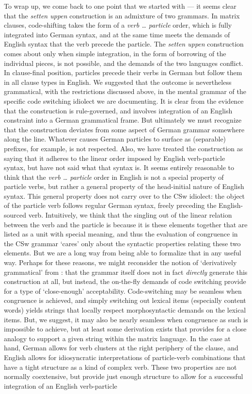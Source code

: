 \documentclass[output=paper]{langscibook}
\begin{document}
To wrap up, we come back to one point that we started with --- it seems clear that the \textit{setten uppen} construction is an admixture of two grammars. In matrix clauses, code-shifting takes the form of a \textit{verb {\ldots} particle} order, which is fully integrated into German syntax, and at the same time meets the demands of English syntax that the verb precede the particle. The \textit{setten uppen} construction comes about only when simple integration, in the form of borrowing of the individual pieces, is not possible, and the demands of the two languages conflict. In clause-final position, particles precede their verbs in German but follow them in all clause types in English. We suggested that the outcome is nevertheless grammatical, with the restrictions discussed above, in the mental grammar of the specific code switching idiolect we are documenting. It is clear from the evidence that the construction is rule-governed, and involves integration of an English constraint into a German grammatical frame. But ultimately we must recognize that the construction deviates from some aspect of German grammar somewhere along the line. Whatever causes German particles to surface as (separable) prefixes, for example, is not respected. Also, we have treated the construction as saying that it adheres to the linear order imposed by English verb-particle syntax, but have not said what that syntax is. It seems entirely reasonable to think that the \textit{verb {\ldots} particle} order in English is not a special property of particle verbs, but rather a general property of the head-initial nature of English syntax. This general property does not carry over to the CSw idiolect: the object of the particle verb follows regular German syntax, freely preceding the English-sourced verb. Intuitively, we think that the singling out of the linear relation between the verb and the particle is because it is these elements together that are listed as a unit with special meaning, and thus the evaluation of congruence in the CSw grammar `cares' only about the syntactic properties relating these two elements. But we are a long way from being able to formalize that in any useful way. Perhaps for these reasons, we might reconsider the notion of `derivatively grammatical' from \cite[242]{chomsky65}: that the grammar itself does not in fact \textit{directly} generate this construction at all, but instead, the on-the-fly demands of code switching provide for a type of `close-enough' acceptability. Code-switching may be seamless when congruence is achieved, and simply switching out lexical items (especially content words) yields strings that locally respect morphosyntactic demands on the lexical items. But, we suggest, it may also be nearly seamless when congruence as such is impossible to achieve, but at least some derivation exists that provides for a close analogy to support a given string within the matrix language. In the case at hand, German allows for verb clusters at the right periphery of the clause, and English allows for idiosyncratic interpretations of particle-verb combinations that have a tight structure as a kind of complex verb. These two properties are not normally coextensive, but provide just enough structure to allow for a successful integration of an English verb-particle 
\end{document}
